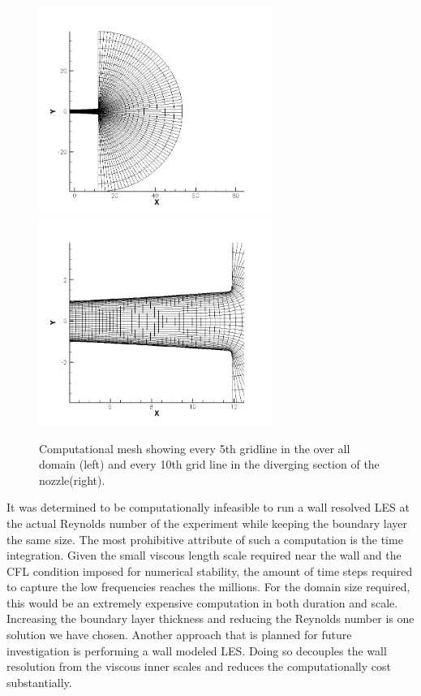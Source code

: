 \documentclass[]{aiaa-tc}%
\begin{document}
\begin{figure}[!htb]%
	\centering
  	\includegraphics[width = 3in]{figs/full5.png}
	\includegraphics[width = 3in]{figs/zoom10.png}
	\caption{Computational mesh showing every 5th gridline in the over all domain (left) and every 10th grid line in the diverging section of the nozzle(right).  }
 	\label{fig:mesh}
\end{figure}

It was determined to be computationally infeasible to run a wall resolved LES at the actual Reynolds number of the experiment while keeping the boundary layer the same size.  The most prohibitive attribute of such a computation is the time integration.  Given the small viscous length scale required near the wall and the CFL condition imposed for numerical stability, the amount of time steps required to capture the low frequencies reaches the millions.  For the domain size required, this would be an extremely expensive computation in both duration and scale.  
Increasing the boundary layer thickness and reducing the Reynolds number is one solution we have chosen.  Another approach that is planned for future investigation is performing a wall modeled LES.  Doing so decouples the wall resolution from the viscous inner scales and reduces the computationally cost substantially.
\end{document}
